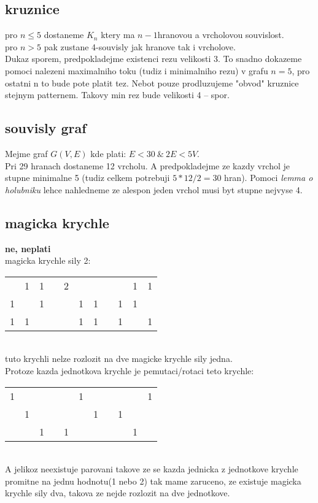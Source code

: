 \documentclass[a4paper]{article}
\begin{document}
\subsection{kruznice}
pro $n \leq 5$ dostaneme $K_n$ ktery ma $n-1$hranovou a vrcholovou souvislost.\\
pro $n > 5$ pak zustane 4-souvisly jak hranove tak i vrcholove.\\ 
Dukaz sporem, predpokladejme existenci rezu velikosti 3.
To snadno dokazeme pomoci nalezeni maximalniho toku
(tudiz i minimalniho rezu) v grafu $n=5$, pro ostatni n to bude pote platit tez.
Nebot pouze prodluzujeme "obvod" kruznice stejnym patternem. Takovy
min rez bude velikosti 4 -- spor.


\subsection{souvisly graf}
Mejme graf $G(V,E)$ kde plati: $E<30~\&~2E < 5V$.\\
Pri 29 hranach dostaneme 12 vrcholu. A predpokladejme ze kazdy
vrchol je stupne minimalne 5 (tudiz celkem potrebuji $5*12/2=30$ hran).
Pomoci \textit{lemma o holubniku} lehce nahledneme ze
alespon jeden vrchol musi byt stupne nejvyse 4.


\subsection{magicka krychle}
\textbf{ne, neplati}\\
magicka krychle sily 2:\\
\begin{tabular}{|c|l|l|l|l|l|l|l|l|l|l|}
    \cline{1-3} \cline{5-7} \cline{9-11}
      & 1 & 1 &  & 2 &   &   &  &   & 1 & 1 \\ \cline{1-3} \cline{5-7} \cline{9-11} 
    1 &   & 1 &  &   & 1 & 1 &  & 1 & 1 &   \\ \cline{1-3} \cline{5-7} \cline{9-11} 
    1 & 1 &   &  &   & 1 & 1 &  & 1 &   & 1 \\ \cline{1-3} \cline{5-7} \cline{9-11} 
\end{tabular}\\
tuto krychli nelze rozlozit na dve magicke krychle sily jedna.\\
Protoze kazda jednotkova krychle je pemutaci/rotaci teto krychle:\\
\begin{tabular}{|c|l|l|l|l|l|l|l|l|l|l|}
  \cline{1-3} \cline{5-7} \cline{9-11}
  1 &   &   &  &   & 1 &   &  &   &   & 1 \\ \cline{1-3} \cline{5-7} \cline{9-11} 
    & 1 &   &  &   &   & 1 &  & 1 &   &   \\ \cline{1-3} \cline{5-7} \cline{9-11} 
    &   & 1 &  & 1 &   &   &  &   & 1 &   \\ \cline{1-3} \cline{5-7} \cline{9-11} 
\end{tabular}\\
A jelikoz neexistuje parovani takove ze se kazda jednicka z
jednotkove krychle promitne na jednu hodnotu(1 nebo 2)
tak mame zaruceno, ze existuje magicka krychle sily dva,
takova ze nejde rozlozit na dve jednotkove.
\end{document}
